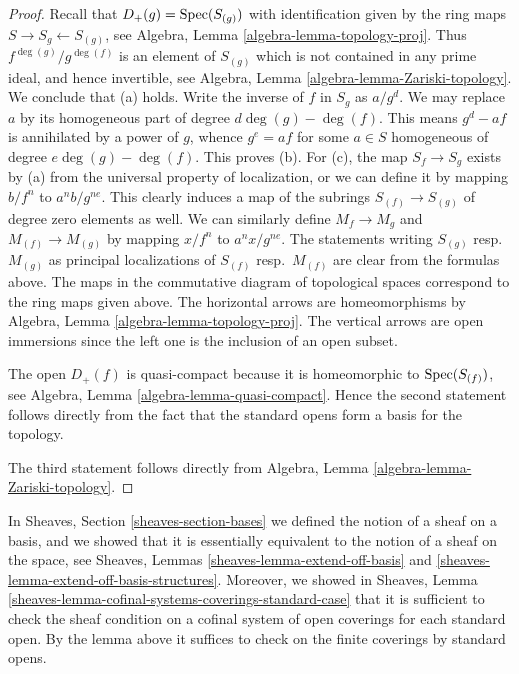 \begin{proof}
Recall that $D_{+}(g) = \mathop{\mathrm{Spec}}(S_{(g)})$ with identification
given by the ring maps $S \to S_g \leftarrow S_{(g)}$, see
Algebra, Lemma \ref{algebra-lemma-topology-proj}.
Thus $f^{\deg(g)}/g^{\deg(f)}$ is an element of $S_{(g)}$ which is not
contained in any prime ideal, and hence invertible,
see Algebra, Lemma \ref{algebra-lemma-Zariski-topology}.
We conclude that (a) holds.
Write the inverse of $f$ in $S_g$ as $a/g^d$.
We may replace $a$ by its homogeneous part of degree $d\deg(g) - \deg(f)$.
This means $g^d - af$ is annihilated by a power of $g$, whence
$g^e = af$ for some $a \in S$ homogeneous of degree $e\deg(g) - \deg(f)$.
This proves (b).
For (c), the map $S_f \to S_g$ exists by (a) from the universal property
of localization, or we can define it by mapping $b/f^n$
to $a^nb/g^{ne}$. This clearly induces a map of the subrings
$S_{(f)} \to S_{(g)}$ of degree zero elements as well.
We can similarly define $M_f \to M_g$ and $M_{(f)} \to M_{(g)}$ by mapping
$x/f^n$ to $a^nx/g^{ne}$. The statements writing $S_{(g)}$
resp.\ $M_{(g)}$ as principal localizations of $S_{(f)}$ resp.\ $M_{(f)}$
are clear from the formulas above. The maps in the commutative diagram
of topological spaces correspond to the ring maps given above. The
horizontal arrows are homeomorphisms by
Algebra, Lemma \ref{algebra-lemma-topology-proj}.
The vertical arrows are open immersions since the left
one is the inclusion of an open subset.

\medskip\noindent
The open $D_{+}(f)$ is quasi-compact because it is homeomorphic
to $\mathop{\mathrm{Spec}}(S_{(f)})$, see  Algebra, Lemma \ref{algebra-lemma-quasi-compact}.
Hence the second statement follows directly
from the fact that the standard opens form
a basis for the topology.

\medskip\noindent
The third statement follows directly from
Algebra, Lemma \ref{algebra-lemma-Zariski-topology}.
\end{proof}

\noindent
In Sheaves, Section \ref{sheaves-section-bases} we defined
the notion of a sheaf on a basis, and we showed that it is
essentially equivalent to the notion of a sheaf on the space,
see Sheaves, Lemmas \ref{sheaves-lemma-extend-off-basis} and
\ref{sheaves-lemma-extend-off-basis-structures}. Moreover,
we showed in
Sheaves, Lemma \ref{sheaves-lemma-cofinal-systems-coverings-standard-case}
that it is sufficient to check the sheaf
condition on a cofinal system of open coverings for each
standard open. By the lemma above it suffices to check
on the finite coverings by standard opens.

